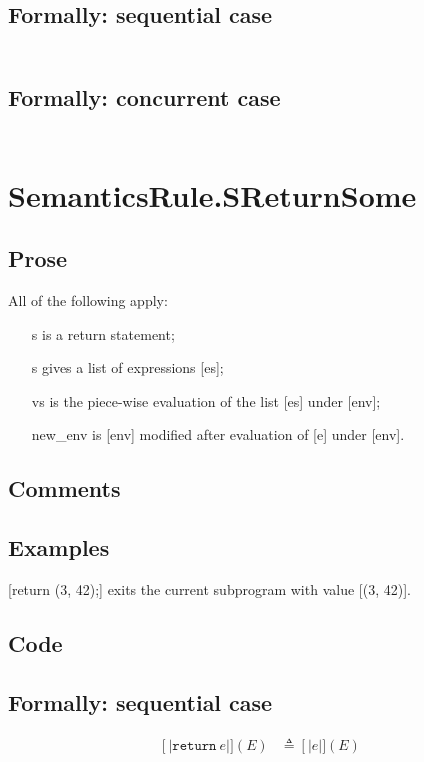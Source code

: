 \documentclass{book}
\newcommand\syntt[1]{\mathtt{#1}}
\newcommand\llbracket{[|}
\newcommand\rrbracket{|]}
\newcommand\interp[1]{\left\llbracket #1 \right\rrbracket}
\begin{document}
  \subsection{Formally: sequential case}
  \begin{align}
  \end{align} 

  \subsection{Formally: concurrent case}
  \begin{align}
  \end{align} 

\section{SemanticsRule.SReturnSome \label{sec:SemanticsRule.SReturnSome}}

    \subsection{Prose}
    All of the following apply:
    \begin{itemize}
    \item [s] is a return statement;
    \item [s] gives a list of expressions [es];
    \item [vs] is the piece-wise evaluation of the list [es] under [env];
    \item [new\_env] is [env] modified after evaluation of [e] under [env].
    \end{itemize}

    \subsection{Comments}

    \subsection{Examples}
    [return (3, 42);] exits the current subprogram with value [(3, 42)].

  \subsection{Code}

  \subsection{Formally: sequential case}
  \begin{align}
  \interp{\syntt{return}\ e} (E) & \triangleq \interp{e} (E)
  \label{eq:sem-seq-sreturn}
  \end{align} 
\end{document}
